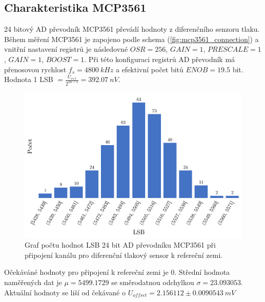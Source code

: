 \subsection{Charakteristika MCP3561}
24 bitový AD převodník MCP3561 převádí hodnoty z diferenčního senzoru tlaku. Během měření MCP3561 je zapojeno podle schema (\ref{fig:mcp3561_connection}) a vnitřní nastavení registrů je následovné $OSR = 256$, $GAIN = 1$, $PRESCALE = 1$, $GAIN = 1$, $BOOST = 1$.
Při této konfiguraci registrů AD převodník má přenosovou rychlost $f_s = 4800 \ kHz$ a efektivní počet bitů $ENOB = 19.5$ bit. Hodnota 1 LSB $= \frac{U_{ref}}{2^{24 - 1}} = 392.07 \ nV$.
\begin{figure}[H]
    \caption{Graf počtu hodnot LSB 24 bit AD převodníku MCP3561 při připojení kanálu
        pro diferenční tlakový sensor k refereční zemi.}
    \includegraphics[width=1\textwidth]{graphs/mcp_gnd.png}
\end{figure}
Očekáváné hodnoty pro připojení k refereční zemi je 0. Střední hodnota naměřených dat je $\mu = 5499.1729$ se směrodatnou odchylkou $\sigma = 23.093053$. Aktuální hodnoty se liší od čekávané o $U_{offset} = 2.156112 \pm 0.0090543 \ mV$

